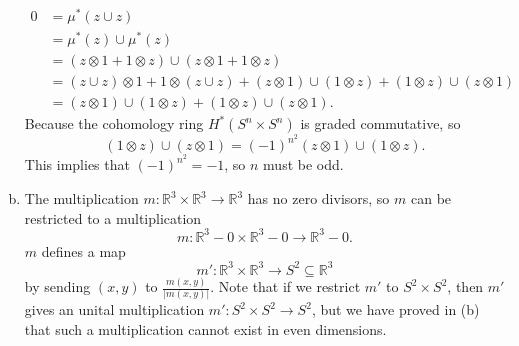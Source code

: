 \documentclass[letterpaper, 12pt]{article}
\begin{document}
\begin{solution}
\begin{enumerate}[(a)]
\begin{align*}
0&=\mu^*(z\cup z)\\
 &=\mu^*(z)\cup\mu^*(z)\\ 
 &=(z\otimes 1+1\otimes z)\cup (z\otimes 1+1\otimes z)\\ 
 &=(z\cup z)\otimes 1+1\otimes (z\cup z)+ (z\otimes 1)\cup (1\otimes z)+(1\otimes z)\cup (z\otimes 1)\\
 &=(z\otimes 1)\cup (1\otimes z)+(1\otimes z)\cup (z\otimes 1).
\end{align*}
Because the cohomology ring \(H^*(S^n\times S^n)\) is graded commutative, so 
\[(1\otimes z)\cup (z\otimes 1)=(-1)^{n^2}(z\otimes 1)\cup (1\otimes z).\]
This implies that \((-1)^{n^2}=-1\), so \(n\) must be odd. 
\item The multiplication \(m:\mathbb{R}^3\times \mathbb{R}^3\rightarrow \mathbb{R}^3\) has no zero divisors, so \(m\) can be restricted to a multiplication
\[m:\mathbb{R}^3-0\times \mathbb{R}^3-0\rightarrow \mathbb{R}^3-0.\]
\(m\) defines a map 
\[m':\mathbb{R}^3\times \mathbb{R}^3\rightarrow S^2\subseteq \mathbb{R}^3\]
by sending \((x,y)\) to \(\frac{m(x,y)}{|m(x,y)|}\). Note that if we restrict \(m'\) to \(S^2\times S^2\), then \(m'\) gives an unital multiplication \(m':S^2\times S^2\rightarrow S^2\), but we have proved in (b) that such a multiplication cannot exist in even dimensions. 
\end{enumerate}
\end{solution}
\end{document}
